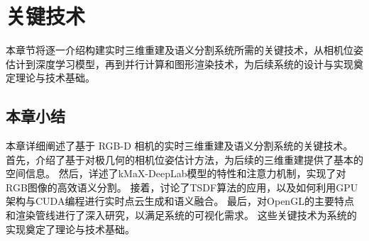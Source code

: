 
\chapter{关键技术}

本章节将逐一介绍构建实时三维重建及语义分割系统所需的关键技术，从相机位姿估计到深度学习模型，再到并行计算和图形渲染技术，为后续系统的设计与实现奠定理论与技术基础。







\section{本章小结}
\par 本章详细阐述了基于 RGB-D 相机的实时三维重建及语义分割系统的关键技术。
首先，介绍了基于对极几何的相机位姿估计方法，为后续的三维重建提供了基本的空间信息。
然后，详述了kMaX-DeepLab模型的特性和注意力机制，实现了对RGB图像的高效语义分割。
接着，讨论了TSDF算法的应用，以及如何利用GPU架构与CUDA编程进行实时点云生成和语义融合。
最后，对OpenGL的主要特点和渲染管线进行了深入研究，以满足系统的可视化需求。
这些关键技术为系统的实现奠定了理论与技术基础。


